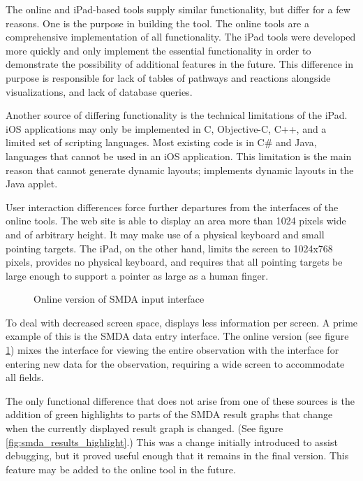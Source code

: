 The online and iPad-based \pathcasemaw tools supply similar functionality, but
differ for a few reasons. One is the purpose in building the tool. The online
tools are a comprehensive implementation of all \pathcasemaw functionality. The
iPad tools were developed more quickly and only implement the essential
functionality in order to demonstrate the possibility of additional features in
the future. This difference in purpose is responsible for \mawappp lack of
tables of pathways and reactions alongside visualizations, and \mawappp lack of
database queries.

Another source of differing functionality is the technical limitations of the
iPad. iOS applications may only be implemented in C, Objective-C, C++, and a
limited set of scripting languages. Most existing \pathcasemaw code is in C\#
and Java, languages that cannot be used in an iOS application. This limitation
is the main reason that \mawapp cannot generate dynamic layouts; \pathcasemaw
implements dynamic layouts in the Java applet.

User interaction differences force further departures from the interfaces of the
online tools. The web site is able to display an area more than 1024 pixels wide
and of arbitrary height. It may make use of a physical keyboard and small
pointing targets. The iPad, on the other hand, limits the screen to 1024x768
pixels, provides no physical keyboard, and requires that all pointing targets
be large enough to support a pointer as large as a human finger.

\begin{figure}[htb]
    \caption{\label{fig:smda_input_online} Online version of SMDA input
    interface}
\end{figure}

To deal with decreased screen space, \mawapp displays less information per
screen. A prime example of this is the SMDA data entry interface. The online
version (see figure \ref{fig:smda_input_online}) mixes the interface for viewing
the entire observation with the interface for entering new data for the
observation, requiring a wide screen to accommodate all fields.

The only functional difference that does not arise from one of these sources is
the addition of green highlights to parts of the SMDA result graphs that change
when the currently displayed result graph is changed. (See figure
\ref{fig:smda_results_highlight}.) This was a change initially introduced to
assist debugging, but it proved useful enough that it remains in the final
version. This feature may be added to the online tool in the future.

